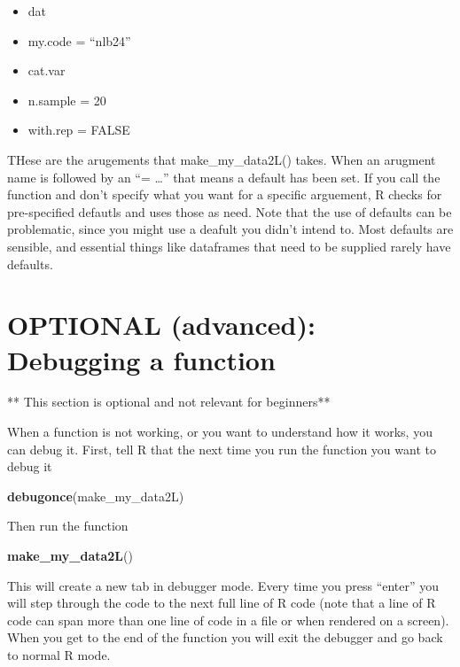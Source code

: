 \documentclass[]{book}
\newenvironment{Shaded}{\begin{snugshade}}{\end{snugshade}}
\newcommand{\KeywordTok}[1]{\textcolor[rgb]{0.13,0.29,0.53}{\textbf{#1}}}
\newcommand{\NormalTok}[1]{#1}
\providecommand{\tightlist}{%
  \setlength{\itemsep}{0pt}\setlength{\parskip}{0pt}}
\theoremstyle{definition}
\theoremstyle{definition}
\theoremstyle{definition}
\theoremstyle{remark}
\begin{document}
\begin{itemize}
\tightlist
\item
  dat
\item
  my.code = ``nlb24''
\item
  cat.var
\item
  n.sample = 20
\item
  with.rep = FALSE
\end{itemize}

THese are the arugements that make\_my\_data2L() takes. When an arugment
name is followed by an ``= \ldots{}'' that means a default has been set.
If you call the function and don't specify what you want for a specific
arguement, R checks for pre-specified defautls and uses those as need.
Note that the use of defaults can be problematic, since you might use a
deafult you didn't intend to. Most defaults are sensible, and essential
things like dataframes that need to be supplied rarely have defaults.

\section{OPTIONAL (advanced): Debugging a
function}\label{optional-advanced-debugging-a-function}

** This section is optional and not relevant for beginners**

When a function is not working, or you want to understand how it works,
you can debug it. First, tell R that the next time you run the function
you want to debug it

\begin{Shaded}
\begin{Highlighting}[]
\KeywordTok{debugonce}\NormalTok{(make_my_data2L)}
\end{Highlighting}
\end{Shaded}

Then run the function

\begin{Shaded}
\begin{Highlighting}[]
\KeywordTok{make_my_data2L}\NormalTok{()}
\end{Highlighting}
\end{Shaded}

This will create a new tab in debugger mode. Every time you press
``enter'' you will step through the code to the next full line of R code
(note that a line of R code can span more than one line of code in a
file or when rendered on a screen). When you get to the end of the
function you will exit the debugger and go back to normal R mode.
\end{document}
